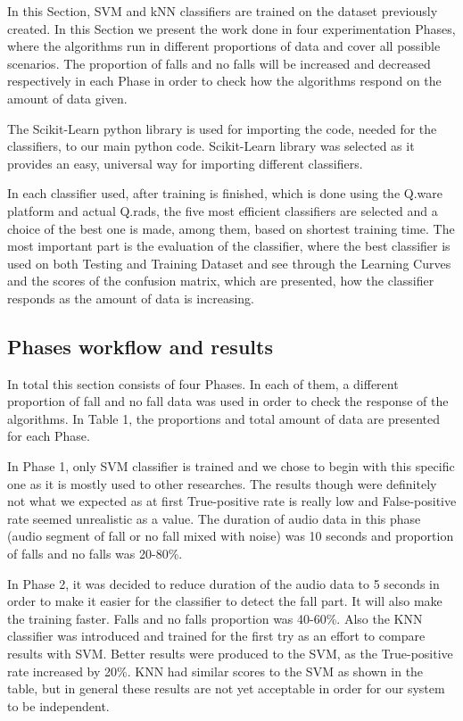 \documentclass{article}
\begin{document}
In this Section, SVM and kNN classifiers are trained on the dataset previously created. In this Section we present the work done in four experimentation Phases, where the algorithms run in different proportions of data and cover all possible scenarios. The proportion of falls and no falls will be increased and decreased respectively in each Phase in order to check how the algorithms respond on the amount of data given.

The Scikit-Learn python library is used for importing the code, needed for the classifiers, to our main python code. Scikit-Learn library was selected as it provides an easy, universal way for importing different classifiers. 

In each classifier used, after training is finished, which is done using the Q.ware platform and actual Q.rads, the five most efficient classifiers are selected and a choice of the best one is made, among them, based on shortest training time. The most important part is the evaluation of the classifier, where the best classifier is used on both Testing and Training Dataset and see through the Learning Curves and the scores of the confusion matrix, which are presented, how the classifier responds as the amount of data is increasing. 

\subsection{Phases workflow and results}

In total this section consists of four Phases. In each of them, a different proportion of fall and no fall data was used in order to check the response of the algorithms. In Table 1, the proportions and total amount of data are presented for each Phase. 

In Phase 1, only SVM classifier is trained and we chose to begin with this specific one as it is mostly used to other researches. The results though were definitely not what we expected as at first True-positive rate is really low and False-positive rate seemed unrealistic as a value. The duration of audio data in this phase (audio segment of fall or no fall mixed with noise) was 10 seconds and proportion of falls and no falls was 20-80\%. 

In Phase 2, it was decided to reduce duration of the audio data to 5 seconds in order to make it easier for the classifier to detect the fall part. It will also make the training faster. Falls and no falls proportion was 40-60\%. Also the KNN classifier was introduced and trained for the first try as an effort to compare results with SVM. Better results were produced to the SVM, as the True-positive rate increased by 20\%. KNN had similar scores to the SVM as shown in the table, but in general these results are not yet acceptable in order for our system to be independent. 
\end{document}
